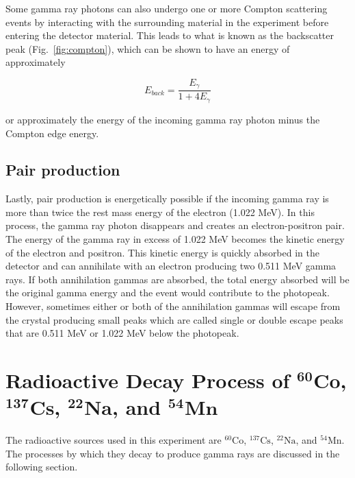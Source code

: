 \documentclass[%
 aip,
rsi,%
 amsmath,amssymb,
 reprint,%
author-numerical,%
]{revtex4-1}
\begin{document}
Some gamma ray photons can also undergo one or more Compton scattering events by interacting with the surrounding material in the experiment before entering the detector material. This leads to what is known as the backscatter peak (Fig.~\ref{fig:compton}), which can be shown to have an energy of approximately

\begin{equation}
 E _ { back} = \frac { E_{\gamma} } { 1 + 4 E_{\gamma}} 
 \label{eq:five}
\end{equation}

\noindent or approximately the energy of the incoming gamma ray photon minus the Compton edge energy.


\subsection{Pair production}
Lastly, pair production is energetically possible if the incoming gamma ray is more than twice the rest mass energy of the electron (1.022 MeV). In this process, the gamma ray photon disappears and creates an electron-positron pair. The energy of the gamma ray in excess of 1.022 MeV becomes the kinetic energy of the electron and positron. This kinetic energy is quickly absorbed in the detector and can annihilate with an electron producing two 0.511 MeV gamma rays. \cite{florida} If both annihilation gammas are absorbed, the total energy absorbed will be the original gamma energy and the event would contribute to the photopeak. However, sometimes either or both of the annihilation gammas will escape from the crystal producing small peaks which are called single or double escape peaks that are 0.511 MeV or 1.022 MeV below the photopeak.

\section{Radioactive Decay Process of $^ {\textbf{60}}\textbf{Co}$, $^ {\textbf{137}}\textbf{Cs}$, $^ {\textbf{22}}\textbf{Na}$, and $^ {\textbf{54}}\textbf{Mn}$ }
The radioactive sources used in this experiment are $\mathrm { ^ { 60 }Co}  $, $\mathrm {  ^ { 137 }Cs }$, $\mathrm { ^ { 22 }Na }$, and $\mathrm { ^ { 54 }Mn } $. The processes by which they decay to produce gamma rays are discussed in the following section.
\end{document}
